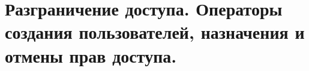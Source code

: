 {
	\section{Разграничение доступа. Операторы создания пользователей, назначения и отмены прав доступа.}
	\newpage
}
